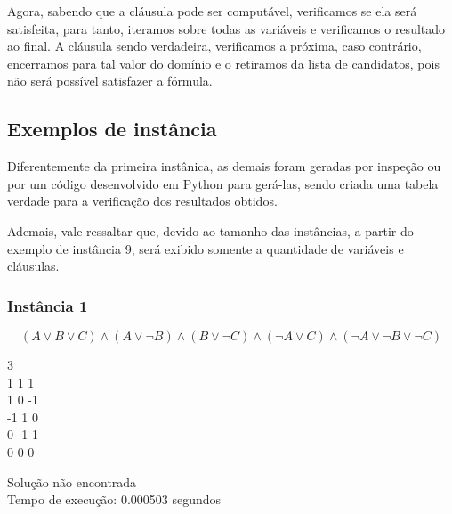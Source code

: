 \documentclass[12pt]{article}
\begin{document}
    \par Agora, sabendo que a cláusula pode ser computável, verificamos se ela será satisfeita, para tanto, iteramos sobre todas as variáveis e verificamos o resultado ao final. A cláusula sendo verdadeira, verificamos a próxima, caso contrário, encerramos para tal valor do domínio e o retiramos da lista de candidatos, pois não será possível satisfazer a fórmula. 

    \subsection{Exemplos de instância}
    \par Diferentemente da primeira instânica, as demais foram geradas por inspeção ou por um código desenvolvido em Python para gerá-las, sendo criada uma tabela verdade para a verificação dos resultados obtidos.
    \par Ademais, vale ressaltar que, devido ao tamanho das instâncias, a partir do exemplo de instância 9, será exibido somente a quantidade de variáveis e cláusulas.
    \subsubsection{Instância 1}
        \[(A \lor B \lor C) \land (A \lor \neg B) \land (B \lor \neg C) \land (\neg A \lor C) \land (\neg A \lor \neg B \lor \neg C)\]
        \begin{tcolorbox}[title=Entrada da instância 1, width=\linewidth, 
          fontupper=\ttfamily, 
          halign=flush left]
            3 \\ 
            1 1 1 \\
            1 0 -1 \\
            -1 1 0 \\
            0 -1 1 \\
            0 0 0 \\
        \end{tcolorbox}
        
        \begin{tcolorbox}[title=Saída da instância 1, width=\linewidth, fontupper=\ttfamily, halign=flush left]
            Solução não encontrada \\
            Tempo de execução: 0.000503 segundos \\  
        \end{tcolorbox}
\end{document}
